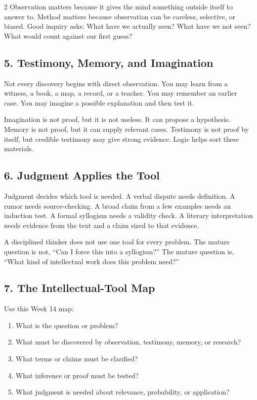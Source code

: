 \documentclass[12pt]{article}
\begin{document}
\begin{multicols}{2}
Observation matters because it gives the mind something outside itself to answer to. Method matters because observation can be careless, selective, or biased. Good inquiry asks: What have we actually seen? What have we not seen? What would count against our first guess?

\subsection*{5. Testimony, Memory, and Imagination}
Not every discovery begins with direct observation. You may learn from a witness, a book, a map, a record, or a teacher. You may remember an earlier case. You may imagine a possible explanation and then test it.

Imagination is not proof, but it is not useless. It can propose a hypothesis. Memory is not proof, but it can supply relevant cases. Testimony is not proof by itself, but credible testimony may give strong evidence. Logic helps sort these materials.

\subsection*{6. Judgment Applies the Tool}
Judgment decides which tool is needed. A verbal dispute needs definition. A rumor needs source-checking. A broad claim from a few examples needs an induction test. A formal syllogism needs a validity check. A literary interpretation needs evidence from the text and a claim sized to that evidence.

A disciplined thinker does not use one tool for every problem. The mature question is not, ``Can I force this into a syllogism?'' The mature question is, ``What kind of intellectual work does this problem need?''

\subsection*{7. The Intellectual-Tool Map}
Use this Week 14 map:
\begin{enumerate}[leftmargin=*,itemsep=0.12em]
\item What is the question or problem?
\item What must be discovered by observation, testimony, memory, or research?
\item What terms or claims must be clarified?
\item What inference or proof must be tested?
\item What judgment is needed about relevance, probability, or application?
\end{enumerate}


\end{multicols}
\end{document}
